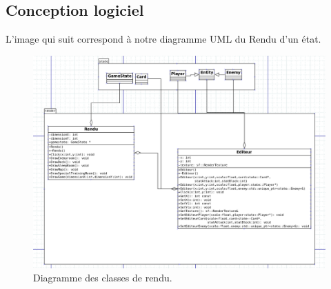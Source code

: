 \subsection{Conception logiciel}

L'image qui suit correspond à notre diagramme UML du Rendu d'un état.

\begin{figure}[p]
\includegraphics[width = 15cm]{images/render.png}
\caption{\label{uml:render}Diagramme des classes de rendu.} 
\end{figure}


\clearpage